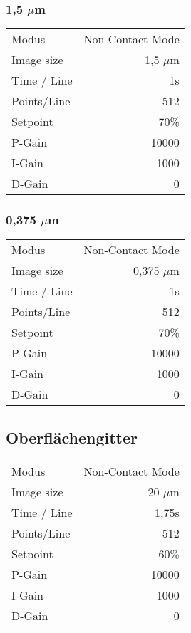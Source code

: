 \subsubsection{1,5 $\mu$m}
\begin{center}
    \centering
    \begin{tabular}{l|r}
        Modus & Non-Contact Mode\\
        Image size & 1,5 $\mu$m \\
        Time / Line & 1s \\
        Points/Line & 512\\
        Setpoint & 70\% \\
        P-Gain & 10000 \\
        I-Gain & 1000 \\
        D-Gain & 0 \\
        
    \end{tabular}
\end{center}

\subsubsection{0,375 $\mu$m}
\begin{center}
    \centering
    \begin{tabular}{l|r}
        Modus & Non-Contact Mode\\
        Image size & 0,375 $\mu$m \\
        Time / Line & 1s \\
        Points/Line & 512\\
        Setpoint & 70\% \\
        P-Gain & 10000 \\
        I-Gain & 1000 \\
        D-Gain & 0 \\
        
    \end{tabular}
\end{center}

\subsection{Oberflächengitter}

\begin{center}
    \centering
    \begin{tabular}{l|r}
        Modus & Non-Contact Mode\\
        Image size & 20 $\mu$m \\
        Time / Line & 1,75s \\
        Points/Line & 512\\
        Setpoint & 60\% \\
        P-Gain & 10000 \\
        I-Gain & 1000 \\
        D-Gain & 0 \\
        
    \end{tabular}
\end{center}

